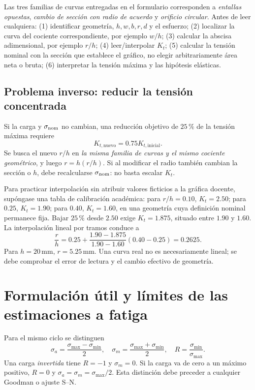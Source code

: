Las tres familias de curvas entregadas en el formulario corresponden a \emph{entallas opuestas}, \emph{cambio de sección con radio de acuerdo} y \emph{orificio circular}. Antes de leer cualquiera: (1) identificar geometría, $h,w,b,r,d$ y el esfuerzo; (2) localizar la curva del cociente correspondiente, por ejemplo $w/h$; (3) calcular la abscisa adimensional, por ejemplo $r/h$; (4) leer/interpolar $K_t$; (5) calcular la tensión nominal con la sección que establece el gráfico, no elegir arbitrariamente área neta o bruta; (6) interpretar la tensión máxima y las hipótesis elásticas.

\subsection{Problema inverso: reducir la tensión concentrada}
Si la carga y $\sigma_{\rm nom}$ no cambian, una reducción objetivo de $25\,\%$ de la tensión máxima requiere
\[
K_{t,\mathrm{nuevo}}=0.75K_{t,\mathrm{inicial}}.
\]
Se busca el nuevo $r/h$ en \emph{la misma familia de curvas y el mismo cociente geométrico}, y luego $r=h(r/h)$. Si al modificar el radio también cambian la sección o $h$, debe recalcularse $\sigma_{\rm nom}$: no basta escalar $K_t$.

Para practicar interpolación sin atribuir valores ficticios a la gráfica docente, supóngase una tabla de calibración académica: para $r/h=0.10$, $K_t=2.50$; para $0.25$, $K_t=1.90$; para $0.40$, $K_t=1.60$, en una geometría cuya definición nominal permanece fija. Bajar $25\,\%$ desde $2.50$ exige $K_t=1.875$, situado entre $1.90$ y $1.60$. La interpolación lineal por tramos conduce a
\[
\frac rh=0.25+\frac{1.90-1.875}{1.90-1.60}(0.40-0.25)=0.2625.
\]
Para $h=20\,\mathrm{mm}$, $r=5.25\,\mathrm{mm}$. Una curva real no es necesariamente lineal; se debe comprobar el error de lectura y el cambio efectivo de geometría.

\section{Formulación útil y límites de las estimaciones a fatiga}
Para el mismo ciclo se distinguen
\[
\sigma_a=\frac{\sigma_{\max}-\sigma_{\min}}2,\quad
\sigma_m=\frac{\sigma_{\max}+\sigma_{\min}}2,\quad
R=\frac{\sigma_{\min}}{\sigma_{\max}}.
\]
Una carga \emph{invertida} tiene $R=-1$ y $\sigma_m=0$. Si la carga va de cero a un máximo positivo, $R=0$ y $\sigma_a=\sigma_m=\sigma_{\max}/2$. Esta distinción debe preceder a cualquier Goodman o ajuste S--N.

